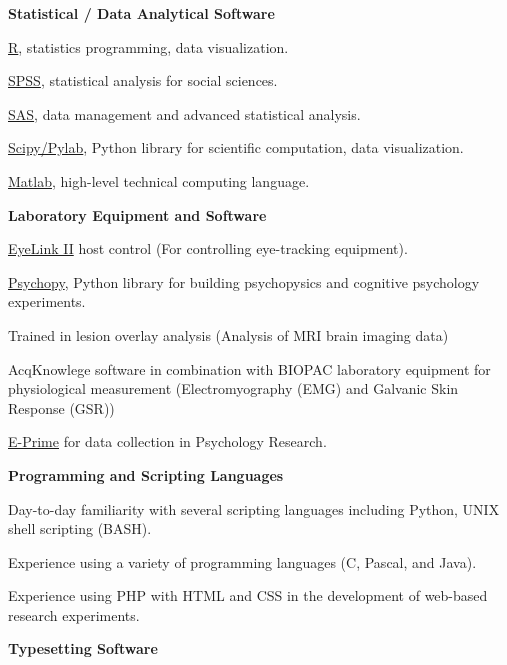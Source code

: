 \documentclass[10pt]{article}
\newenvironment{innerlist}[1][\enskip\textbullet]%
        {\begin{compactenum}[#1]}{\end{compactenum}}
\begin{document}
\begin{outerlist}
\itemsep1pt\parskip0pt
\item
  \textbf{Statistical / Data Analytical Software}

 \begin{innerlist}
  \itemsep1pt\parskip0pt
  \item
    \href{http://www.r-project.org/}{R}, statistics programming, data
    visualization.
  \item
    \href{http://www.spss.com/}{SPSS}, statistical analysis for social
    sciences.
  \item
    \href{http://www.sas.com/}{SAS}, data management and advanced
    statistical analysis.
  \item
    \href{http://www.scipy.org/}{Scipy/Pylab}, Python library for
    scientific computation, data visualization.
  \item
    \href{https://www.mathworks.com/products/matlab/}{Matlab},
    high-level technical computing language.
 \end{innerlist}
\item
  \textbf{Laboratory Equipment and Software}

 \begin{innerlist}
  \itemsep1pt\parskip0pt
  \item
    \href{www.sr-research.com}{EyeLink II} host control (For controlling
    eye-tracking equipment).
  \item
    \href{http://www.psychopy.org/}{Psychopy}, Python library for
    building psychopysics and cognitive psychology experiments.
  \item
    Trained in lesion overlay analysis (Analysis of MRI brain imaging
    data)
  \item
    AcqKnowlege software in combination with BIOPAC laboratory equipment
    for physiological measurement (Electromyography (EMG) and Galvanic
    Skin Response (GSR))
  \item
    \href{http://www.pstnet.com/products/e-prime/}{E-Prime} for data
    collection in Psychology Research.
 \end{innerlist}
\item
  \textbf{Programming and Scripting Languages}

 \begin{innerlist}
  \itemsep1pt\parskip0pt
  \item
    Day-to-day familiarity with several scripting languages including
    Python, UNIX shell scripting (BASH).
  \item
    Experience using a variety of programming languages (C, Pascal, and
    Java).
  \item
    Experience using PHP with HTML and CSS in the development of
    web-based research experiments.
 \end{innerlist}
\item
  \textbf{Typesetting Software}


\end{outerlist}
\end{document}
